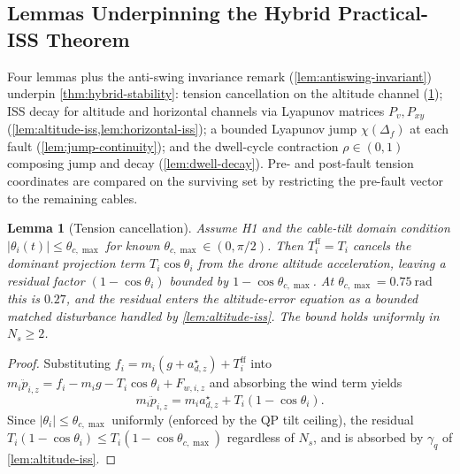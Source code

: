 \documentclass[lettersize,journal]{IEEEtran}
\newtheorem{lemma}{Lemma}%
\begin{document}
\subsection{Lemmas Underpinning the Hybrid Practical-ISS Theorem}
\label{sec:five-lemmas}

Four lemmas plus the anti-swing invariance remark (\cref{lem:antiswing-invariant}) underpin \cref{thm:hybrid-stability}: tension cancellation on the altitude channel (\cref{lem:tension-cancel}); ISS decay for altitude and horizontal channels via Lyapunov matrices $P_v,P_{xy}$ (\cref{lem:altitude-iss,lem:horizontal-iss}); a bounded Lyapunov jump $\chi(\Delta_f)$ at each fault (\cref{lem:jump-continuity}); and the dwell-cycle contraction $\rho\in(0,1)$ composing jump and decay (\cref{lem:dwell-decay}). Pre- and post-fault tension coordinates are compared on the surviving set by restricting the pre-fault vector to the remaining cables.

\begin{lemma}[Tension cancellation]
\label{lem:tension-cancel}
Assume H1 and the cable-tilt domain condition
$|\theta_i(t)| \le \theta_{c,\max}$ for known
$\theta_{c,\max} \in (0, \pi/2)$. Then
$T_i^{\mathrm{ff}} = T_i$ cancels the dominant projection term
$T_i\cos\theta_i$ from the drone altitude acceleration,
leaving a residual factor $(1 - \cos\theta_i)$ bounded by
$1 - \cos\theta_{c,\max}$. At $\theta_{c,\max} =
\SI{0.75}{\radian}$ this is $0.27$, and the residual enters the altitude-error equation as a bounded matched disturbance
handled by \cref{lem:altitude-iss}. The bound holds uniformly
in $N_s \ge 2$.
\end{lemma}

\begin{proof}
Substituting $f_i = m_i(g + a_{d,z}^\star) + T_i^{\mathrm{ff}}$
into $m_i \ddot{p}_{i,z} = f_i - m_i g - T_i\cos\theta_i +
F_{w,i,z}$ and absorbing the wind term yields
\begin{equation}
  m_i \ddot{p}_{i,z}
    = m_i a_{d,z}^\star + T_i(1 - \cos\theta_i).
  \label{eq:alt-dynamics-residual}
\end{equation}
Since $|\theta_i| \le \theta_{c,\max}$ uniformly (enforced by the QP tilt ceiling), the residual $T_i(1-\cos\theta_i) \le T_i(1 - \cos\theta_{c,\max})$ regardless of $N_s$, and is absorbed by $\gamma_q$ of \cref{lem:altitude-iss}.
\end{proof}
\end{document}
